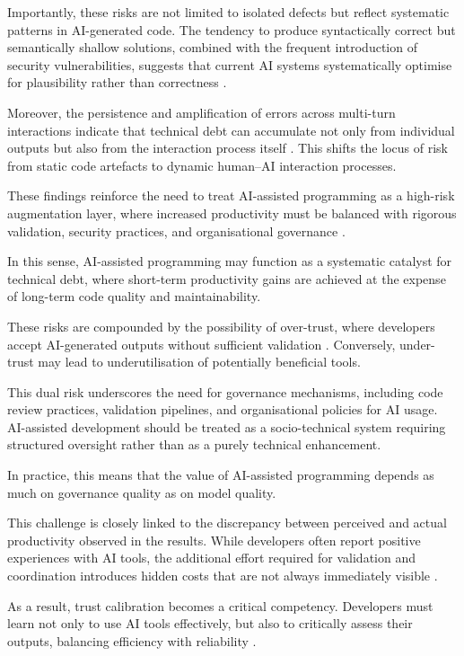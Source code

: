 \documentclass[conference]{IEEEtran}
\begin{document}
Importantly, these risks are not limited to isolated defects but reflect systematic patterns in AI-generated code. The tendency to produce syntactically correct but semantically shallow solutions, combined with the frequent introduction of security vulnerabilities, suggests that current AI systems systematically optimise for plausibility rather than correctness \cite{sabra_assessing_2025, cotroneo_human-written_2025}.

Moreover, the persistence and amplification of errors across multi-turn interactions indicate that technical debt can accumulate not only from individual outputs but also from the interaction process itself \cite{zhong_developer-llm_2025}. This shifts the locus of risk from static code artefacts to dynamic human--AI interaction processes.

These findings reinforce the need to treat AI-assisted programming as a high-risk augmentation layer, where increased productivity must be balanced with rigorous validation, security practices, and organisational governance \cite{dora_hidden_2025}.

In this sense, AI-assisted programming may function as a systematic catalyst for technical debt, where short-term productivity gains are achieved at the expense of long-term code quality and maintainability.

These risks are compounded by the possibility of over-trust, where developers accept AI-generated outputs without sufficient validation \cite{lyu_my_2025}. Conversely, under-trust may lead to underutilisation of potentially beneficial tools.

This dual risk underscores the need for governance mechanisms, including code review practices, validation pipelines, and organisational policies for AI usage. AI-assisted development should be treated as a socio-technical system requiring structured oversight rather than as a purely technical enhancement.

In practice, this means that the value of AI-assisted programming depends as much on governance quality as on model quality.

This challenge is closely linked to the discrepancy between perceived and actual productivity observed in the results. While developers often report positive experiences with AI tools, the additional effort required for validation and coordination introduces hidden costs that are not always immediately visible \cite{vaillant_developers_2024}.

As a result, trust calibration becomes a critical competency. Developers must learn not only to use AI tools effectively, but also to critically assess their outputs, balancing efficiency with reliability \cite{hicks_new_2024}.
\end{document}
